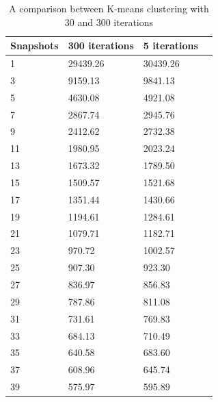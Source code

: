 			\begin {center}
			\begin{table}
				\centering
				\caption{A comparison between K-means clustering with 30 and 300 iterations}
				\label {table:compare_clustring_iterations}
				\begin{tabular}{p{2cm}p{3cm}p{3cm}p{3cm}}
					\hline
					Snapshots  & 300 iterations & 5 iterations \\ \hline
					1 & 29439.26 & 30439.26 \\  
					3 & 9159.13  & 9841.13\\
					5 & 4630.08  & 4921.08\\
					7 & 2867.74  & 2945.76\\
					9 & 2412.62  & 2732.38\\
					11 & 1980.95  & 2023.24\\
					13 & 1673.32  & 1789.50\\
					15 & 1509.57  & 1521.68\\
					17 & 1351.44  & 1430.66\\
					19 & 1194.61  & 1284.61\\
					21 & 1079.71  & 1182.71\\
					23 & 970.72  & 1002.57\\
					25 & 907.30  & 923.30\\
					27 & 836.97  & 856.83\\
					29 & 787.86  & 811.08\\
					31 & 731.61  & 769.83\\
					33 & 684.13  & 710.49\\
					35 & 640.58  & 683.60\\
					37 & 608.96  & 645.74\\
					39 & 575.97  & 595.89\\\hline
				\end{tabular}
			\end{table}
			\end{center}

